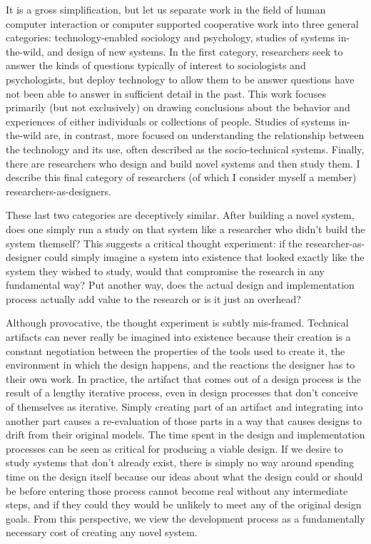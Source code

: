 It is a gross simplification, but let us separate work in the field of human computer interaction or computer supported cooperative work into three general categories: technology-enabled sociology and psychology, studies of systems in-the-wild, and design of new systems. In the first category, researchers seek to answer the kinds of questions typically of interest to sociologists and psychologists, but deploy technology to allow them to be answer questions have not been able to answer in sufficient detail in the past. This work focuses primarily (but not exclusively) on drawing conclusions about the behavior and experiences of either individuals or collections of people. Studies of systems in-the-wild are, in contrast, more focused on understanding the relationship between the technology and its use, often described as the socio-technical systems. Finally, there are researchers who design and build novel systems and then study them. I describe this final category of researchers (of which I consider myself a member) researchers-as-designers. 

These last two categories are deceptively similar. After building a novel system, does one simply run a study on that system like a researcher who didn't build the system themself? This suggests a critical thought experiment: if the researcher-as-designer could simply imagine a system into existence that looked exactly like the system they wished to study, would that compromise the research in any fundamental way? Put another way, does the actual design and implementation process actually add value to the research or is it just an overhead?

Although provocative, the thought experiment is subtly mis-framed. Technical artifacts can never really be imagined into existence because their creation is a constant negotiation between the properties of the tools used to create it, the environment in which the design happens, and the reactions the designer has to their own work. In practice, the artifact that comes out of a design process is the result of a lengthy iterative process, even in design processes that don't conceive of themselves as iterative. Simply creating part of an artifact and integrating into another part causes a re-evaluation of those parts in a way that causes designs to drift from their original models. The time spent in the design and implementation processes can be seen as critical for producing a viable design. If we desire to study systems that don't already exist, there is simply no way around spending time on the design itself because our ideas about what the design could or should be before entering those process cannot become real without any intermediate steps, and if they could they would be unlikely to meet any of the original design goals. From this perspective, we view the development process as a fundamentally necessary cost of creating any novel system. 

